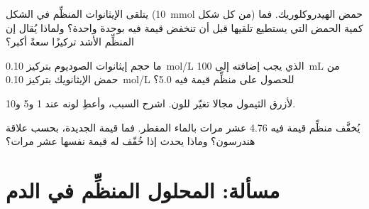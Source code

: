 \begin{exercise}[$\star\star\star$]\label{exo:g12:buffers-predominance:12}
يتلقى  الإيثانوات المنظِّم في الشكل (\qty{10}{mmol} من كل شكل)
حمض الهيدروكلوريك. فما كمية الحمض التي يستطيع تلقيها قبل أن تنخفض قيمة  فيه
بوحدة واحدة؟ ولماذا يُقال إن  المنظِّم الأشد تركيزًا
سعةً أكبر؟
\end{exercise}

\begin{exercise}[$\star\star\star$]\label{exo:g12:buffers-predominance:13}
ما حجم  إيثانوات الصوديوم بتركيز \qty{0.10}{mol/L} الذي يجب
إضافته إلى \qty{100}{mL} من حمض الإيثانويك بتركيز \qty{0.10}{mol/L} للحصول على
 منظِّم قيمة  فيه 5.0؟
\end{exercise}

\begin{exercise}[$\star\star\star$]\label{exo:g12:buffers-predominance:14}
لأزرق الثيمول مجالا تغيّر للون. اشرح السبب، وأعطِ
لونه عند  1 و5 و10.
\end{exercise}

\begin{exercise}[$\star\star\star$]\label{exo:g12:buffers-predominance:15}
يُخفَّف  منظِّم قيمة  فيه 4.76 عشر مرات بالماء المقطر. فما
قيمة  الجديدة، بحسب علاقة هندرسون؟ وماذا يحدث إذا خُفّف  له قيمة  نفسها عشر مرات؟
\end{exercise}

\section{مسألة: المحلول المنظِّم في الدم}

